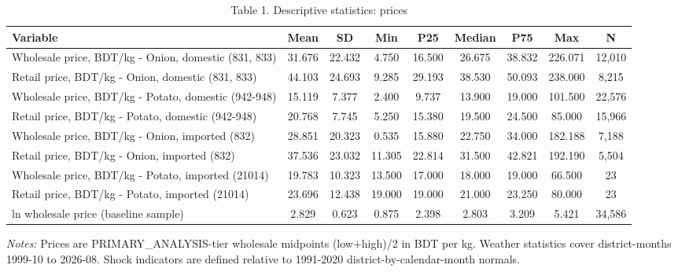 \begin{table}[htbp]\centering\small
\caption{Table 1. Descriptive statistics: prices}\label{tab:table1a_descriptives_prices}
\begin{tabular}{lcccccccc}
\toprule
Variable & Mean & SD & Min & P25 & Median & P75 & Max & N \\
\midrule
Wholesale price, BDT/kg - Onion, domestic (831, 833) & 31.676 & 22.432 & 4.750 & 16.500 & 26.675 & 38.832 & 226.071 & 12,010 \\
Retail price, BDT/kg - Onion, domestic (831, 833) & 44.103 & 24.693 & 9.285 & 29.193 & 38.530 & 50.093 & 238.000 & 8,215 \\
Wholesale price, BDT/kg - Potato, domestic (942-948) & 15.119 & 7.377 & 2.400 & 9.737 & 13.900 & 19.000 & 101.500 & 22,576 \\
Retail price, BDT/kg - Potato, domestic (942-948) & 20.768 & 7.745 & 5.250 & 15.380 & 19.500 & 24.500 & 85.000 & 15,966 \\
Wholesale price, BDT/kg - Onion, imported (832) & 28.851 & 20.323 & 0.535 & 15.880 & 22.750 & 34.000 & 182.188 & 7,188 \\
Retail price, BDT/kg - Onion, imported (832) & 37.536 & 23.032 & 11.305 & 22.814 & 31.500 & 42.821 & 192.190 & 5,504 \\
Wholesale price, BDT/kg - Potato, imported (21014) & 19.783 & 10.323 & 13.500 & 17.000 & 18.000 & 19.000 & 66.500 & 23 \\
Retail price, BDT/kg - Potato, imported (21014) & 23.696 & 12.438 & 19.000 & 19.000 & 21.000 & 23.250 & 80.000 & 23 \\
ln wholesale price (baseline sample) & 2.829 & 0.623 & 0.875 & 2.398 & 2.803 & 3.209 & 5.421 & 34,586 \\
\bottomrule
\end{tabular}
\begin{minipage}{0.95\linewidth}\footnotesize \textit{Notes:} Prices are PRIMARY\_ANALYSIS-tier wholesale midpoints (low+high)/2 in BDT per kg. Weather statistics cover district-months 1999-10 to 2026-08. Shock indicators are defined relative to 1991-2020 district-by-calendar-month normals.\end{minipage}
\end{table}